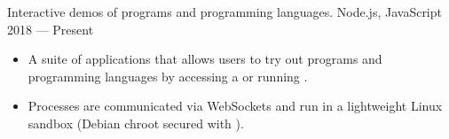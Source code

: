\showoff
{}
{Interactive demos of programs and programming languages.}
{Node.js, JavaScript}
{2018 --- Present}

\begin{itemize}[label=$\triangleright$]
    \item A suite of applications that allows users to try out programs and programming languages by accessing a  or running .
    \item Processes are communicated via WebSockets and run in a lightweight Linux sandbox (Debian chroot secured with ).
\end{itemize}
